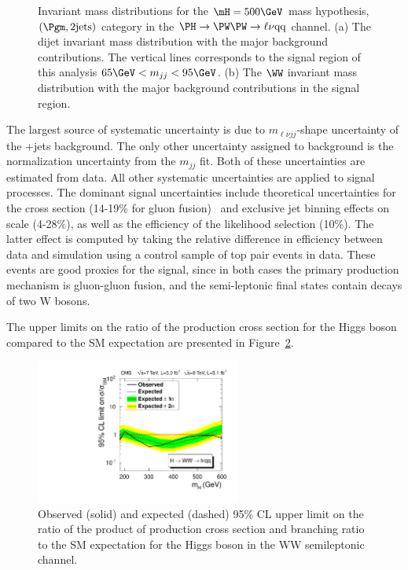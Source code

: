 \begin{figure}[htbp]
  \caption{\label{fig:lvjjfits} Invariant mass distributions for the
    $\mH=500\GeV$ mass hypothesis, $(\Pgm,2\rm{jets})$ category in the
    $\PH \to \PW\PW \to \ell\nu \rm{qq}$ channel.
    (a) The dijet invariant mass
    distribution with the major background contributions.
    The vertical lines corresponds to the signal region of this analysis
    $65\GeV < m_{jj}
    < 95\GeV$.
    (b) The $\WW$ invariant mass distribution with the major background
    contributions in the signal region.
    }
\end{figure}

The largest source of systematic uncertainty is due to $m_{\ell\nu jj}$-shape uncertainty of the \PW+jets background.
The only other uncertainty assigned to background is the normalization uncertainty from the $m_{jj}$ fit. Both of these 
uncertainties are estimated from data. All other systematic uncertainties are applied to signal processes. The dominant 
signal uncertainties include theoretical uncertainties for the cross section (14-19\% for gluon fusion)~\cite{LHCHiggsCrossSectionWorkingGroup:2011ti} and exclusive jet binning effects on scale (4-28\%), as well as the 
efficiency of the likelihood selection (10\%). The latter effect is computed by taking the relative difference in efficiency 
between data and simulation using a control sample of top pair events in data. These events are good proxies for the signal,
since in both cases the primary production mechanism is gluon-gluon fusion, and the semi-leptonic final states contain
decays of two W bosons.

The upper limits on the ratio of the production cross section for the Higgs boson compared to the SM expectation are 
presented in Figure~\ref{fig:hwwlvjjlim}. 

\begin{figure}[htbp]
  \centering
  \includegraphics[width=0.6\textwidth]{figures/WW2l2qLimit.pdf}
  \caption{\label{fig:hwwlvjjlim} Observed (solid) and expected
  (dashed) 95\% CL upper limit on the ratio of the product of production cross
  section and branching ratio to the SM expectation for the Higgs boson in the WW
  semileptonic channel.}  
\end{figure}
